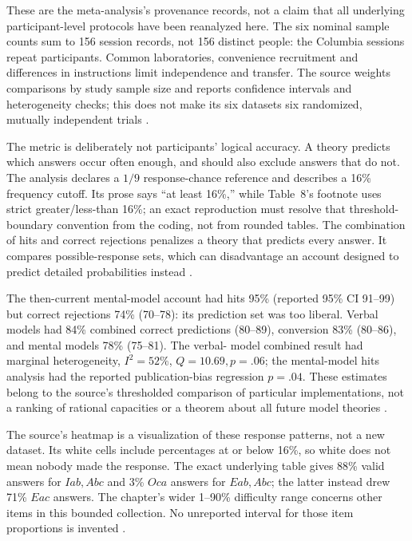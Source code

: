These are the meta-analysis's provenance records, not a claim that all
underlying participant-level protocols have been reanalyzed here. The
six nominal sample counts sum to 156 session records, not 156 distinct
people: the Columbia sessions repeat participants. Common laboratories,
convenience recruitment and differences in instructions limit independence
and transfer. The source weights comparisons by study sample size and
reports confidence intervals and heterogeneity checks; this does not make
its six datasets six randomized, mutually independent trials
\cite[Table~5, p.~21 of the advance-online text]
{KhemlaniJohnsonLaird2012SyllogismMeta}.

The metric is deliberately not participants' logical accuracy. A theory
predicts which answers occur often enough, and should also exclude answers
that do not. The analysis declares a \(1/9\) response-chance reference
and describes a 16\% frequency cutoff. Its prose says ``at least 16\%,''
while Table~8's footnote uses strict greater/less-than 16\%; an exact
reproduction must resolve that threshold-boundary convention from the
coding, not from rounded tables. The combination of hits and correct
rejections penalizes a theory that predicts every answer. It compares
possible-response sets, which can disadvantage an account designed to
predict detailed probabilities instead
\cite[pp.~19--21,25 of the advance-online text]
{KhemlaniJohnsonLaird2012SyllogismMeta}.

The then-current mental-model account had hits 95\% (reported 95\% CI
91--99) but correct rejections 74\% (70--78): its prediction set was too
liberal. Verbal models had 84\% combined correct predictions (80--89),
conversion 83\% (80--86), and mental models 78\% (75--81). The verbal-
model combined result had marginal heterogeneity, \(I^2=52\%\),
\(Q=10.69,p=.06\); the mental-model hits analysis had the reported
publication-bias regression \(p=.04\). These estimates belong to the
source's thresholded comparison of particular implementations, not a
ranking of rational capacities or a theorem about all future model theories
\cite[Table~8, p.~25 of the advance-online text]
{KhemlaniJohnsonLaird2012SyllogismMeta}.

The source's heatmap is a visualization of these response patterns, not a
new dataset. Its white cells include percentages at or below 16\%, so white
does not mean nobody made the response. The exact underlying table gives
88\% valid answers for \(Iab,Abc\) and 3\% \(Oca\) answers for
\(Eab,Abc\); the latter instead drew 71\% \(Eac\) answers.
The chapter's wider 1--90\% difficulty range concerns other items in this
bounded collection. No unreported interval for those item proportions is
invented \cite[pp.~226--228]{Khemlani2021Syllogistic}
\cite[Table~6, p.~22 of the advance-online text]
{KhemlaniJohnsonLaird2012SyllogismMeta}.

